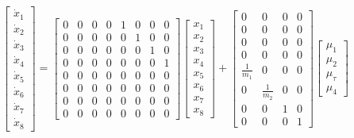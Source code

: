 \documentclass{UoNMCHA}
\numberwithin{equation}{section}
\begin{document}
	\begin{equation}
	\left[\begin{array}{c}
	\dot{x}_{1} \\
	\dot{x}_{2} \\
	\dot{x}_{3} \\
	\dot{x}_{4} \\
	\dot{x}_{5} \\
	\dot{x}_{6} \\
	\dot{x}_{7} \\
	\dot{x}_{8}
	\end{array}\right]=\left[\begin{array}{llllllll}
	0 & 0 & 0 & 0 & 1 & 0 & 0 & 0 \\
	0 & 0 & 0 & 0 & 0 & 1 & 0 & 0 \\
	0 & 0 & 0 & 0 & 0 & 0 & 1 & 0 \\
	0 & 0 & 0 & 0 & 0 & 0 & 0 & 1 \\
	0 & 0 & 0 & 0 & 0 & 0 & 0 & 0 \\
	0 & 0 & 0 & 0 & 0 & 0 & 0 & 0 \\
	0 & 0 & 0 & 0 & 0 & 0 & 0 & 0 \\
	0 & 0 & 0 & 0 & 0 & 0 & 0 & 0
	\end{array}\right]\left[\begin{array}{c}
	x_{1} \\
	x_{2} \\
	x_{3} \\
	x_{4} \\
	x_{5} \\
	x_{6} \\
	x_{7} \\
	x_{8}
	\end{array}\right]+\left[\begin{array}{cccc}
	0 & 0 & 0 & 0 \\
	0 & 0 & 0 & 0 \\
	0 & 0 & 0 & 0 \\
	0 & 0 & 0 & 0 \\
	\frac{1}{m_{1}} & 0 & 0 & 0 \\
	0 & \frac{1}{m_{2}} & 0 & 0 \\
	0 & 0 & 1 & 0 \\
	0 & 0 & 0 & 1
	\end{array}\right]\left[\begin{array}{c}
	\mu_{1} \\
	\mu_{2} \\
	\mu_{\tau} \\
	\mu_{4}
	\end{array}\right]
	\end{equation}
	
\end{document}
